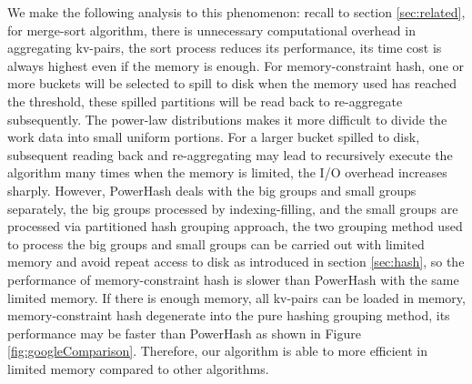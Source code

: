 We make the following analysis to this phenomenon: recall to section \ref{sec:related}, for merge-sort algorithm, there is unnecessary computational overhead in aggregating kv-pairs, the sort process reduces its performance, its time cost is always highest even if the memory is enough. For memory-constraint hash, one or more buckets will be selected to spill to disk when the memory used has reached the threshold, these spilled partitions will be read back to re-aggregate subsequently. The power-law distributions makes it more difficult to divide the work data into small uniform portions. For a larger bucket spilled to disk, subsequent reading back and re-aggregating may lead to recursively execute the algorithm many times when the memory is limited, the I/O overhead increases sharply. However, PowerHash deals with the big groups and small groups separately, the big groups processed by indexing-filling, and the small groups are processed via partitioned hash grouping approach, the two grouping method used to process the big groups and small groups can be carried out with limited memory and avoid repeat access to disk as introduced in section \ref{sec:hash}, so the performance of memory-constraint hash is slower than PowerHash with the same limited memory. If there is enough memory, all kv-pairs can be loaded in memory, memory-constraint hash degenerate into the pure hashing grouping method, its performance may be faster than PowerHash as shown in Figure \ref{fig:googleComparison}. Therefore, our algorithm is able to more efficient in limited memory compared to other algorithms.

